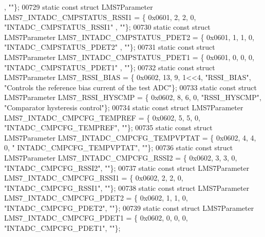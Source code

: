 \begin{DoxyCode}
      , \textcolor{stringliteral}{""}\};
00729 \textcolor{keyword}{static} \textcolor{keyword}{const} \textcolor{keyword}{struct }LMS7Parameter LMS7_INTADC_CMPSTATUS_RSSI1 = \{ 0x0601, 2, 2, 0, \textcolor{stringliteral}{"INTADC\_CMPSTATUS\_RSSI1"}
      , \textcolor{stringliteral}{""}\};
00730 \textcolor{keyword}{static} \textcolor{keyword}{const} \textcolor{keyword}{struct }LMS7Parameter LMS7_INTADC_CMPSTATUS_PDET2 = \{ 0x0601, 1, 1, 0, \textcolor{stringliteral}{"INTADC\_CMPSTATUS\_PDET2"}
      , \textcolor{stringliteral}{""}\};
00731 \textcolor{keyword}{static} \textcolor{keyword}{const} \textcolor{keyword}{struct }LMS7Parameter LMS7_INTADC_CMPSTATUS_PDET1 = \{ 0x0601, 0, 0, 0, \textcolor{stringliteral}{"INTADC\_CMPSTATUS\_PDET1"}
      , \textcolor{stringliteral}{""}\};
00732 \textcolor{keyword}{static} \textcolor{keyword}{const} \textcolor{keyword}{struct }LMS7Parameter LMS7_RSSI_BIAS = \{ 0x0602, 13, 9, 1<<4, \textcolor{stringliteral}{"RSSI\_BIAS"}, \textcolor{stringliteral}{"Controls the
       reference bias current of the test ADC"}\};
00733 \textcolor{keyword}{static} \textcolor{keyword}{const} \textcolor{keyword}{struct }LMS7Parameter LMS7_RSSI_HYSCMP = \{ 0x0602, 8, 6, 0, \textcolor{stringliteral}{"RSSI\_HYSCMP"}, \textcolor{stringliteral}{"Comparator
       hysteresis control"}\};
00734 \textcolor{keyword}{static} \textcolor{keyword}{const} \textcolor{keyword}{struct }LMS7Parameter LMS7_INTADC_CMPCFG_TEMPREF = \{ 0x0602, 5, 5, 0, \textcolor{stringliteral}{"INTADC\_CMPCFG\_TEMPREF"}, \textcolor{stringliteral}{
      ""}\};
00735 \textcolor{keyword}{static} \textcolor{keyword}{const} \textcolor{keyword}{struct }LMS7Parameter LMS7_INTADC_CMPCFG_TEMPVPTAT = \{ 0x0602, 4, 4, 0, \textcolor{stringliteral}{"
      INTADC\_CMPCFG\_TEMPVPTAT"}, \textcolor{stringliteral}{""}\};
00736 \textcolor{keyword}{static} \textcolor{keyword}{const} \textcolor{keyword}{struct }LMS7Parameter LMS7_INTADC_CMPCFG_RSSI2 = \{ 0x0602, 3, 3, 0, \textcolor{stringliteral}{"INTADC\_CMPCFG\_RSSI2"}, \textcolor{stringliteral}{""}\};
00737 \textcolor{keyword}{static} \textcolor{keyword}{const} \textcolor{keyword}{struct }LMS7Parameter LMS7_INTADC_CMPCFG_RSSI1 = \{ 0x0602, 2, 2, 0, \textcolor{stringliteral}{"INTADC\_CMPCFG\_RSSI1"}, \textcolor{stringliteral}{""}\};
00738 \textcolor{keyword}{static} \textcolor{keyword}{const} \textcolor{keyword}{struct }LMS7Parameter LMS7_INTADC_CMPCFG_PDET2 = \{ 0x0602, 1, 1, 0, \textcolor{stringliteral}{"INTADC\_CMPCFG\_PDET2"}, \textcolor{stringliteral}{""}\};
00739 \textcolor{keyword}{static} \textcolor{keyword}{const} \textcolor{keyword}{struct }LMS7Parameter LMS7_INTADC_CMPCFG_PDET1 = \{ 0x0602, 0, 0, 0, \textcolor{stringliteral}{"INTADC\_CMPCFG\_PDET1"}, \textcolor{stringliteral}{""}\};

\end{DoxyCode}
